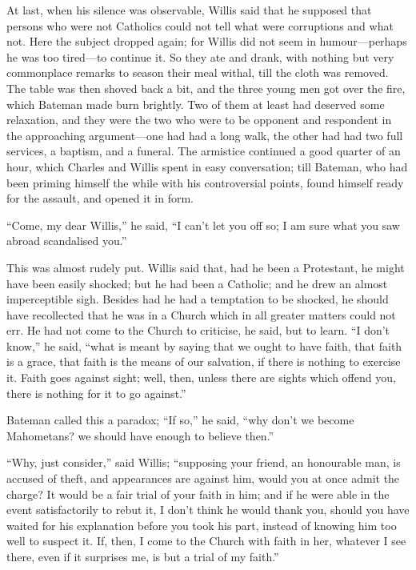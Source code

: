At last, when his silence was observable, Willis said that he
supposed that persons who were not Catholics could not tell what were
corruptions and what not. Here the subject dropped again; for Willis
did not seem in humour—perhaps he was too tired—to continue it. So
they ate and drank, with nothing but very commonplace remarks to
season their meal withal, till the cloth was removed. The table was
then shoved back a bit, and the three young men got over the fire,
which Bateman made burn brightly. Two of them at least had deserved
some relaxation, and they were the two who were to be opponent and
respondent in the approaching argument—one had had a long walk, the
other had had two full services, a baptism, and a funeral. The
armistice continued a good quarter of an hour, which Charles and
Willis spent in easy conversation; till Bateman, who had been priming
himself the while with his controversial points, found himself ready
for the assault, and opened it in form.

``Come, my dear Willis,'' he said, ``I can't let you
off so; I am sure what you saw abroad scandalised you.''

This was almost rudely put. Willis said that, had he been a
Protestant, he might have been easily shocked; but he had been a
Catholic; and he drew an almost imperceptible sigh. Besides had he had
a temptation to be shocked, he should have recollected that he was in
a Church which in all greater matters could not err. He had not come
to the Church to criticise, he said, but to learn. ``I don't
know,'' he said, ``what is meant by saying that we ought to
have faith, that faith is a grace, that faith is the means of our
salvation, if there is nothing to exercise it. Faith goes against
sight; well, then, unless there are sights which offend you, there is
nothing for it to go against.''

Bateman called this a paradox; ``If so,'' he said,
``why don't we become Mahometans? we should have enough to believe
then.''

``Why, just consider,'' said Willis; ``supposing your
friend, an honourable man, is accused of theft, and appearances are
against him, would you at once admit the charge? It would be a fair
trial of your faith in him; and if he were able in the event
satisfactorily to rebut it, I don't think he would thank you, should
you have waited for his explanation before you took his part, instead
of knowing him too well to suspect it. If, then, I come to the Church
with faith in her, whatever I see there, even if it surprises me, is
but a trial of my faith.''

